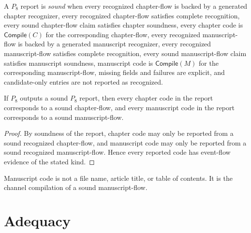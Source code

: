 \begin{definition}
\label{def:chapter-manuscript-sound-p8-report}
A $P_8$ report is \emph{sound} when every recognized chapter-flow is backed by a generated chapter recognizer, every recognized chapter-flow satisfies complete recognition, every sound chapter-flow claim satisfies chapter soundness, every chapter code is $\mathsf{Compile}(C)$ for the corresponding chapter-flow, every recognized manuscript-flow is backed by a generated manuscript recognizer, every recognized manuscript-flow satisfies complete recognition, every sound manuscript-flow claim satisfies manuscript soundness, manuscript code is $\mathsf{Compile}(M)$ for the corresponding manuscript-flow, missing fields and failures are explicit, and candidate-only entries are not reported as recognized.
\end{definition}

\begin{theorem}
\label{thm:chapter-manuscript-sound-p8-report}
If $P_8$ outputs a sound $P_8$ report, then every chapter code in the report corresponds to a sound chapter-flow, and every manuscript code in the report corresponds to a sound manuscript-flow.
\end{theorem}

\begin{proof}
By soundness of the report, chapter code may only be reported from a sound recognized chapter-flow, and manuscript code may only be reported from a sound recognized manuscript-flow. Hence every reported code has event-flow evidence of the stated kind.
\end{proof}

\begin{corollary}
\label{cor:chapter-manuscript-code-flow-mediated}
Manuscript code is not a file name, article title, or table of contents. It is the channel compilation of a sound manuscript-flow.
\end{corollary}

\section{Adequacy}
\label{sec:chapter-manuscript-adequacy}

